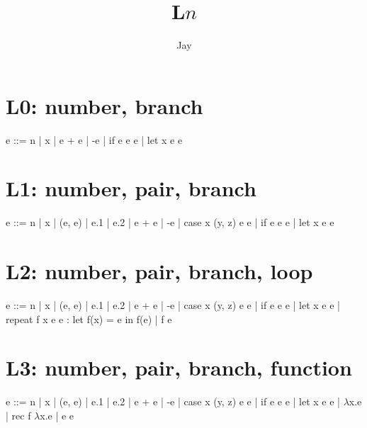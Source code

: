\documentclass[a4paper]{article}
\title{L$n$}
\author{Jay}
\begin{document}
\maketitle

\section*{L0: number, branch}
\begin{bnfgrammar}
  e ::=
    n
  | x
  | e + e
  | -e
  | if e e e
  | let x e e
\end{bnfgrammar}

\section*{L1: number, pair, branch}
\begin{bnfgrammar}
  e ::=
    n
  | x
  | (e, e)
  | e.1
  | e.2
  | e + e
  | -e
  | case x (y, z) e e
  | if e e e
  | let x e e
\end{bnfgrammar}

\section*{L2: number, pair, branch, loop}
\begin{bnfgrammar}
  e ::=
    n
  | x
  | (e, e)
  | e.1
  | e.2
  | e + e
  | -e
  | case x (y, z) e e
  | if e e e
  | let x e e
  | repeat f x e e : let f(x) = e in f(e)
  | f e
\end{bnfgrammar}

\section*{L3: number, pair, branch, function}
\begin{bnfgrammar}
  e ::=
    n
  | x
  | (e, e)
  | e.1
  | e.2
  | e + e
  | -e
  | case x (y, z) e e
  | if e e e
  | let x e e
  | $\lambda$x.e
  | rec f $\lambda$x.e
  | e e
\end{bnfgrammar}
\end{document}
